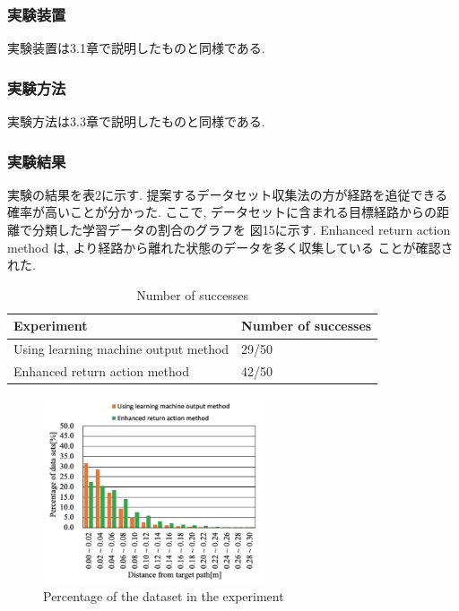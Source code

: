 \documentclass{jarticle}
\begin{document}
\subsubsection{実験装置}
実験装置は3.1章で説明したものと同様である.
\vspace*{2.5mm}
\subsubsection{実験方法}
実験方法は3.3章で説明したものと同様である.
\vspace*{2.5mm}
\subsubsection{実験結果}
実験の結果を表2に示す. 提案するデータセット収集法の方が経路を追従できる確率が高いことが分かった.
ここで, データセットに含まれる目標経路からの距離で分類した学習データの割合のグラフを
図15に示す. Enhanced return action method は, より経路から離れた状態のデータを多く収集している
ことが確認された.


\begin{table}[h!]
  \caption{Number of successes} \vspace*{2mm}\hspace*{-10mm}
    \begin{tabular}{|l|l|}
      \hline\hline
      Experiment & Number of successes \\
      \hline\hline
      Using learning machine output method & 29/50 \\
      Enhanced return action method & 42/50\\
      \hline
    \end{tabular}
\end {table}


\begin{figure}[h!]\vspace*{-5mm}
  \centering
   \includegraphics[height=55mm]{./figs/enh.png}
   \caption{Percentage of the dataset in the experiment}
\end{figure}
\end{document}
